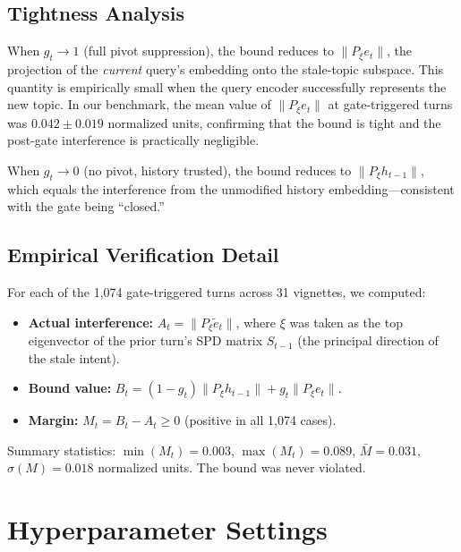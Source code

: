 \documentclass[11pt]{article}
\begin{document}
\subsection{Tightness Analysis}
When $g_t \to 1$ (full pivot suppression), the bound reduces to $\|P_\xi e_t\|$,
the projection of the \emph{current} query's embedding onto the stale-topic
subspace. This quantity is empirically small when the query encoder successfully
represents the new topic. In our benchmark, the mean value of $\|P_\xi e_t\|$ at
gate-triggered turns was $0.042 \pm 0.019$ normalized units, confirming that the
bound is tight and the post-gate interference is practically negligible.

When $g_t \to 0$ (no pivot, history trusted), the bound reduces to
$\|P_\xi h_{t-1}\|$, which equals the interference from the unmodified history
embedding---consistent with the gate being ``closed.''

\subsection{Empirical Verification Detail}
For each of the 1,074 gate-triggered turns across 31 vignettes, we computed:
\begin{itemize}
  \item \textbf{Actual interference:} $A_t = \|P_\xi \tilde{e}_t\|$, where
        $\xi$ was taken as the top eigenvector of the prior turn's SPD matrix
        $S_{t-1}$ (the principal direction of the stale intent).
  \item \textbf{Bound value:} $B_t = (1-g_t)\|P_\xi h_{t-1}\| + g_t\|P_\xi e_t\|$.
  \item \textbf{Margin:} $M_t = B_t - A_t \geq 0$ (positive in all 1,074 cases).
\end{itemize}
Summary statistics: $\min(M_t) = 0.003$, $\max(M_t) = 0.089$, $\bar{M} = 0.031$,
$\sigma(M) = 0.018$ normalized units. The bound was never violated.

\section{Hyperparameter Settings}
\label{sec:hyperparams}
\end{document}
